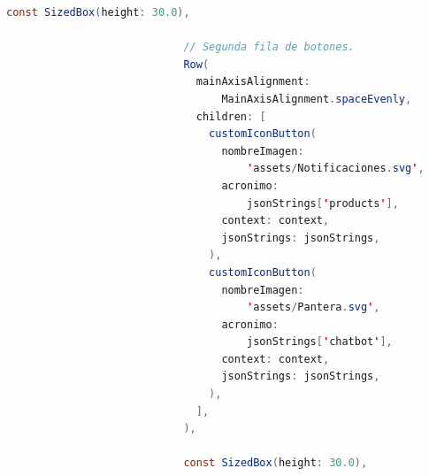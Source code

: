 \begin{lstlisting}[language=Java, caption={Código completo de la screen 'welcome page'}]
                            const SizedBox(height: 30.0),

                            // Segunda fila de botones.
                            Row(
                              mainAxisAlignment:
                                  MainAxisAlignment.spaceEvenly,
                              children: [
                                customIconButton(
                                  nombreImagen:
                                      'assets/Notificaciones.svg',
                                  acronimo:
                                      jsonStrings['products'],
                                  context: context,
                                  jsonStrings: jsonStrings,
                                ),
                                customIconButton(
                                  nombreImagen:
                                      'assets/Pantera.svg',
                                  acronimo:
                                      jsonStrings['chatbot'],
                                  context: context,
                                  jsonStrings: jsonStrings,
                                ),
                              ],
                            ),

                            const SizedBox(height: 30.0),


\end{lstlisting}
